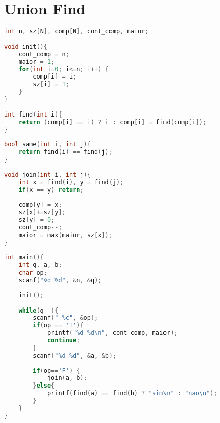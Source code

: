 \documentclass[12pt,a4paper,twoside]{report}
\begin{document}
\section{Union Find}
\noindent\begin{lstlisting}[caption=Union Find,language=C++]
int n, sz[N], comp[N], cont_comp, maior;
 
void init(){
    cont_comp = n;
    maior = 1;
    for(int i=0; i<=n; i++) {
        comp[i] = i;
        sz[i] = 1;
    }
}
 
int find(int i){
    return (comp[i] == i) ? i : comp[i] = find(comp[i]);
}
 
bool same(int i, int j){
    return find(i) == find(j);
}
 
void join(int i, int j){
    int x = find(i), y = find(j);
    if(x == y) return;
     
    comp[y] = x;
    sz[x]+=sz[y];
    sz[y] = 0;
    cont_comp--;
    maior = max(maior, sz[x]);
}
 
int main(){
    int q, a, b;
    char op;
    scanf("%d %d", &n, &q);
     
    init();
     
    while(q--){
        scanf(" %c", &op);
        if(op == 'T'){
            printf("%d %d\n", cont_comp, maior);
            continue;
        }
        scanf("%d %d", &a, &b);
         
        if(op=='F') {
            join(a, b);
        }else{
            printf(find(a) == find(b) ? "sim\n" : "nao\n");
        }
    }
}
\end{lstlisting}
\end{document}
